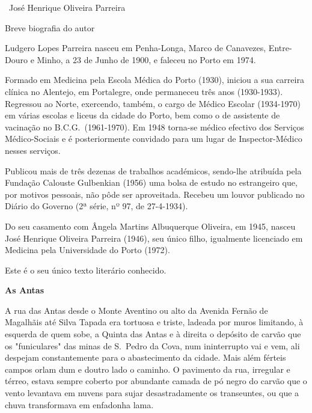 \documentclass[9pt]{article}
\begin{document}
{\rule{0pt}{1.5em}

~\hfill José Henrique Oliveira Parreira

\verso

\newpage \newpage\rule{0pt}{7em}\begin{center}\sc\normalsize Breve biografia do autor\end{center} \thispagestyle{empty}

Ludgero Lopes Parreira nasceu em Penha-Longa, Marco de Canavezes, En\-tre-Douro e Minho, a 23 de Junho de 1900, e faleceu no Porto em 1974.

Formado em Medicina pela Escola Médica do Porto (1930), iniciou a sua carreira clínica no Alentejo, em Portalegre, onde permaneceu três anos (1930-1933). Regressou ao Norte, exercendo, também, o cargo de Médico Escolar (1934-1970) em várias escolas e liceus da cidade do Porto, bem como o de assistente de vacina\-ção no B.C.G.\ (1961-1970). Em 1948 torna-se médico efectivo dos Serviços Médico-Sociais e é posteriormente convidado para um lugar de Inspector-Médico nesses serviços.

Publicou mais de três dezenas de traba\-lhos académicos, sendo-\-lhe atribuída pela Funda\-ção Calouste Gulbenkian (1956) uma bolsa de estudo no estrangeiro que, por motivos pessoais, não pôde ser aproveitada. Recebeu um louvor publicado no Diário do Governo (2ª
série, nº 97, de 27-4-1934).

Do seu casamento com Ângela Martins Albuquerque Oliveira, em 1945, nasceu José Henrique Oliveira Parreira (1946), seu único fi\-lho, igualmente licenciado em Medicina pela Universidade do Porto (1972).

Este é o seu único texto literário conhecido.
} %

\verso

\begin{center}\bf\large As Antas\end{center}

A rua das Antas desde o Monte Aventino ou alto da Avenida Fernão
de Maga\-lhãis até Silva Tapada era tortuosa e triste, ladeada por muros
limitando, à esquerda de quem sobe, a Quinta das Antas e à direita o depósito de carvão que os "funiculares" das minas de S.\ Pedro da Cova, num
ininterrupto vai e vem, ali despejam constantemente para o abastecimento
da cidade. Mais além férteis campos orlam dum e doutro lado o caminho.
O pavimento da rua, irregular e térreo, estava sempre coberto por abundante camada de pó negro do carvão que o vento levantava em nuvens para sujar desastradamente os transeuntes, ou que a chuva transformava em enfadonha lama.
\end{document}
